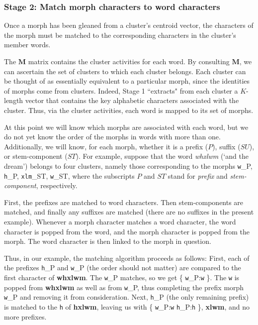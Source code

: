 \subsubsection{Stage 2: Match morph characters to word characters} Once a morph has been gleaned from a cluster's centroid vector, the characters of the morph must be matched to the corresponding characters in the cluster's member words. 

The $\mathbf{M}$ matrix contains the cluster activities for each word. By consulting $\mathbf{M}$, we can ascertain the set of clusters to
which each cluster belongs. Each cluster can be thought of as essentially equivalent to a particular morph, since the identities of morphs come from clusters. Indeed, Stage 1 ``extracts" from each cluster a $K$-length vector that  contains the key alphabetic characters associated with the cluster. Thus, via the cluster activities, each word is mapped to its set of morphs.

At this point we will know which morphs are associated with each word, but we do not yet know the order of the morphs in words with more than one. Additionally, we will know, for each morph, whether it is a prefix ($P$), suffix ($SU$), or stem-component ($ST$). For example, suppose that the word \textit{whxlwm} (`and the dream') belongs to four clusters, namely those corresponding to the morphs \texttt{w}_{P}, \texttt{h}_{P}, \texttt{xlm}_{ST}, \texttt{w}_{ST}, where the subscripts $P$ and $ST$ stand for \textit{prefix} and \textit{stem-component}, respectively.

First, the prefixes are matched to word characters. Then stem-components are matched, and finally any suffixes are matched (there are no suffixes in the present example). Whenever a morph character matches a word character, the word character is popped from the word, and the morph character is popped from the morph. The word character is then linked to the morph in question. 

Thus, in our example, the matching algorithm proceeds as follows: First, each of the prefixes \texttt{h}_{P} and \texttt{w}_{P} (the order should not matter) are compared to the first character of \textbf{whxlwm}. The \texttt{w}_{P} matches, so we get \{ \texttt{w}_{P}:\texttt{w} \}. The \texttt{w} is popped from \textbf{whxlwm} as well as from \texttt{w}_{P}, thus completing the prefix morph \texttt{w}_{P} and removing it from consideration. Next, \texttt{h}_{P} (the only remaining prefix) is matched to the \texttt{h} of \textbf{hxlwm}, leaving us with \{  \texttt{w}_{P}:\texttt{w} \texttt{h}_{P}:\texttt{h} \}, \textbf{xlwm}, and no more prefixes.

